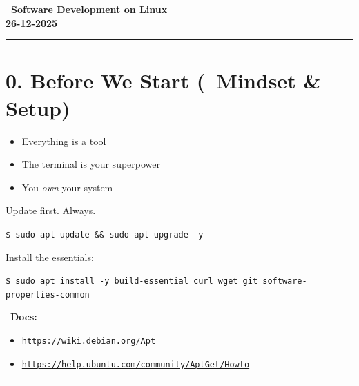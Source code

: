 \documentclass[12pt]{article}
\newcommand{\courseTitle}{Software Development on Linux}
\newcommand{\courseDate}{26-12-2025}
\newcommand{\mindseticon}{\faBrain}
\newcommand{\codeicon}{\faCode}
\newcommand{\bookicon}{\faBook}
\begin{document}
\begin{center}
\headingfont\Huge\bfseries\color{navy}
\codeicon\ \courseTitle\\[0.5em]
\Large\color{teamred}
\courseDate
\end{center}

\vspace{1em}
\begin{center}
\color{teamred}\rule{0.8\textwidth}{1pt}
\end{center}

\section*{0. Before We Start (\mindseticon\ Mindset \& Setup)}

\begin{itemize}
    \item Everything is a tool
    \item The terminal is your superpower
    \item You \textit{own} your system
\end{itemize}

Update first. Always.

\begin{highlightbox}
\texttt{\$ sudo apt update \&\& sudo apt upgrade -y}
\end{highlightbox}

Install the essentials:

\begin{highlightbox}
\texttt{\$ sudo apt install -y build-essential curl wget git software-properties-common}
\end{highlightbox}

\begin{infobox}
\bookicon\ \textbf{Docs:}
\begin{itemize}
    \item \href{https://wiki.debian.org/Apt}{\texttt{https://wiki.debian.org/Apt}}
    \item \href{https://help.ubuntu.com/community/AptGet/Howto}{\texttt{https://help.ubuntu.com/community/AptGet/Howto}}
\end{itemize}
\end{infobox}

\vspace{1em}
\begin{center}
\color{teamred}\rule{0.8\textwidth}{1pt}
\end{center}
\end{document}
